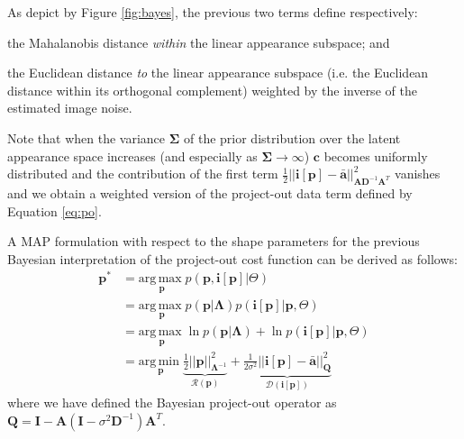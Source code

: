 As depict by Figure \ref{fig:bayes}, the previous two terms define respectively: 
\begin{inparaenum}
    \item the Mahalanobis distance \emph{within} the linear appearance subspace; and 
    \item the Euclidean distance \emph{to} the linear appearance subspace (i.e. the Euclidean distance within its orthogonal complement) weighted by the inverse of the estimated image noise.
\end{inparaenum} 
Note that when the variance $\mathbf{\Sigma}$ of the prior distribution over the latent appearance space increases (and especially as
$\mathbf{\Sigma} \rightarrow \infty$) $\mathbf{c}$ becomes uniformly distributed and the contribution of the first term $\frac{1}{2}|| \mathbf{i}[\mathbf{p}] - \mathbf{\bar{a}} ||^2_{\mathbf{A}\mathbf{D}^{-1}\mathbf{A}^T}$ vanishes and we obtain a weighted version of the project-out data term defined by Equation \ref{eq:po}. 

A MAP formulation with respect to the shape parameters for the previous Bayesian interpretation of the project-out cost function can be derived as follows:
\begin{equation}
    \begin{aligned}
        \mathbf{p}^* & = \underset{\mathbf{p}}{\mathrm{arg\,max\;}} p(\mathbf{p}, \mathbf{i}[\mathbf{p}] | \Theta) 
        \\
        & = \underset{\mathbf{p}}{\mathrm{arg\,max\;}}  p(\mathbf{p} | \mathbf{\Lambda})  p(\mathbf{i}[\mathbf{p}] |
        \mathbf{p}, \Theta)  
        \\
        & = \underset{\mathbf{p}}{\mathrm{arg\,max\;}}  \ln p(\mathbf{p} | \mathbf{\Lambda}) + \ln p(\mathbf{i}[\mathbf{p}] | \mathbf{p}, \Theta)
        \\
        & = \underset{\mathbf{p}}{\mathrm{arg\,min\;}}  \underbrace{\frac{1}{2} ||\mathbf{p}||^2_{\mathbf{\Lambda}^{-1}}}_{\mathcal{R}(\mathbf{p})} + \underbrace{\frac{1}{2\sigma^2}|| \mathbf{i}[\mathbf{p}] - \mathbf{\bar{a}} ||^2_{\mathbf{Q}}}_{\mathcal{D}(\mathbf{i}[\mathbf{p}])}
    \end{aligned}
    \label{eq:prob_rpo}
\end{equation}
where we have defined the Bayesian project-out operator as $\mathbf{Q} = \mathbf{I} - \mathbf{A}(\mathbf{I} - \sigma^2\mathbf{D}^{-1})\mathbf{A}^T$.

